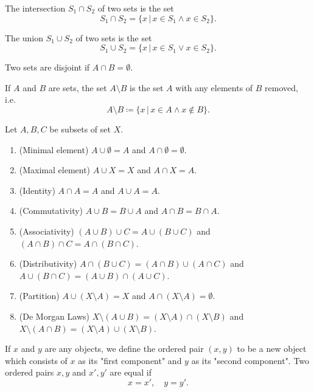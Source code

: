 \documentclass{article}
\begin{document}
\begin{definition}[Intersection]
	The intersection \(S_1\cap S_2\) of two sets is the set
	\begin{equation*}
		S_1\cap S_2=\{x\,|\,x\in S_1\wedge x\in S_2\}.
	\end{equation*}
\end{definition}
\begin{definition}[Union]
	The union \(S_1\cup S_2\) of two sets is the set
	\begin{equation*}
		S_1\cup S_2=\{x\,|\,x\in S_1\vee x\in S_2\}.
	\end{equation*}
\end{definition}
\begin{definition}[Disjoint]
	Two sets are disjoint if \(A\cap B=\emptyset\).
\end{definition}
\begin{definition}
	If \(A\) and \(B\) are sets, the set \(A\setminus B\) is the set \(A\) with any elements of \(B\) removed, i.e.
	\begin{equation*}
		A\setminus B\coloneq\{x\,|\,x\in A\wedge x\notin B\}.
	\end{equation*}
\end{definition}
\begin{proposition}
	Let \(A,B,C\) be subsets of set \(X\).
	\begin{enumerate}
		\item (Minimal element) \(A\cup\emptyset=A\) and \(A\cap\emptyset=\emptyset\).
		\item (Maximal element) \(A\cup X=X\) and \(A\cap X=A\).
		\item (Identity) \(A\cap A=A\) and \(A\cup A=A\).
		\item (Commutativity) \(A\cup B=B\cup A\) and \(A\cap B=B\cap A\).
		\item (Associativity) \((A\cup B)\cup C=A\cup(B\cup C)\) and \((A\cap B)\cap C=A\cap(B\cap C)\).
		\item (Distributivity) \(A\cap (B\cup C)=(A\cap B)\cup(A\cap C)\) and \(A\cup(B\cap C)=(A\cup B)\cap(A\cup C)\).
		\item (Partition) \(A\cup(X\setminus A)=X\) and \(A\cap (X\setminus A)=\emptyset\).
		\item (De Morgan Laws) \(X\setminus(A\cup B)=(X\setminus A)\cap(X\setminus B)\) and \(X\setminus (A\cap B)=(X\setminus A)\cup(X\setminus B)\).
	\end{enumerate}
\end{proposition}
\begin{definition}
	If \(x\) and \(y\) are any objects, we define the ordered pair \((x,y)\) to be a new object which consists of \(x\) as its "first component" and \(y\) as its "second component". Two ordered pairs \(x,y\) and \(x',y'\) are equal if
	\begin{equation*}
		x=x',\quad y=y'.
	\end{equation*}
\end{definition}
\end{document}

